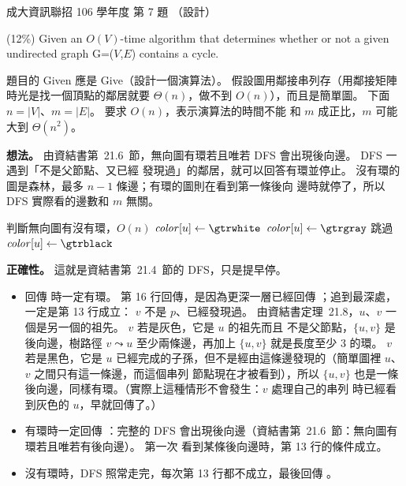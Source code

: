 \begin{pastexam}[label={px:ncku-106-prog-07}]{成大資訊聯招 106 學年度 第 7 題}
（設計）

(12\%) Given an $O(V)$-time algorithm that determines whether or not a given undirected graph
G=($V$,$E$) contains a cycle.
\end{pastexam}

\begin{pastsoln}
題目的 Given 應是 Give（設計一個演算法）。 假設圖用鄰接串列存（用鄰接矩陣時光是找一個頂點的鄰居就要
$\Theta(n)$，做不到 $O(n)$），而且是簡單圖。 下面 $n = |V|$、$m = |E|$。 要求 $O(n)$，表示演算法的時間不能
和 $m$ 成正比，$m$ 可能大到 $\Theta(n^2)$。

\textbf{想法。} 由資結書第~21.6~節，無向圖有環若且唯若 DFS 會出現後向邊。 DFS 一遇到「不是父節點、又已經
發現過」的鄰居，就可以回答有環並停止。 沒有環的圖是森林，最多 $n - 1$ 條邊；有環的圖則在看到第一條後向
邊時就停了，所以 DFS 實際看的邊數和 $m$ 無關。

\begin{pseudo}{判斷無向圖有沒有環，$O(n)$}
        \State $\mathit{color}[u] \gets \gtrwhite$
    \EndFor
            \State \Return \TRUE
        \EndIf
    \EndFor
    \State \Return \FALSE
\EndFunction
{} 
    \State $\mathit{color}[u] \gets \gtrgray$
            \State 跳過 
            \State \Return \TRUE {}
            \State \Return \TRUE
        \EndIf
    \EndFor
    \State $\mathit{color}[u] \gets \gtrblack$
    \State \Return \FALSE
\EndFunction
\end{pseudo}

\textbf{正確性。} 這就是資結書第~21.4~節的 DFS，只是提早停。
\begin{itemize}
\item 回傳 \TRUE 時一定有環。 第 16 行回傳，是因為更深一層已經回傳 \TRUE；追到最深處，一定是第 13 行成立：
$v$ 不是 $p$、已經發現過。 由資結書定理~21.8，$u$、$v$ 一個是另一個的祖先。 $v$ 若是灰色，它是 $u$ 的祖先而且
不是父節點，$\{u, v\}$ 是後向邊，樹路徑 $v \leadsto u$ 至少兩條邊，再加上 $\{u, v\}$ 就是長度至少 $3$ 的環。 $v$
若是黑色，它是 $u$ 已經完成的子孫，但不是經由這條邊發現的（簡單圖裡 $u$、$v$ 之間只有這一條邊，而這個串列
節點現在才被看到），所以 $\{u, v\}$ 也是一條後向邊，同樣有環。（實際上這種情形不會發生：$v$ 處理自己的串列
時已經看到灰色的 $u$，早就回傳了。）
\item 有環時一定回傳 \TRUE：完整的 DFS 會出現後向邊（資結書第~21.6~節：無向圖有環若且唯若有後向邊）。 第一次
看到某條後向邊時，第 13 行的條件成立。
\item 沒有環時，DFS 照常走完，每次第 13 行都不成立，最後回傳 \FALSE。
\end{itemize}


\end{pastsoln}
